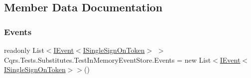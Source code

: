 \subsection{Member Data Documentation}
\mbox{\label{classCqrs_1_1Tests_1_1Substitutes_1_1TestInMemoryEventStore_add97988e933c2316c445bf4611c2d0ba}} 
\subsubsection{\texorpdfstring{Events}{Events}}
{\footnotesize\ttfamily readonly List$<$\hyperlink{interfaceCqrs_1_1Events_1_1IEvent}{I\+Event}$<$\hyperlink{interfaceCqrs_1_1Authentication_1_1ISingleSignOnToken}{I\+Single\+Sign\+On\+Token}$>$ $>$ Cqrs.\+Tests.\+Substitutes.\+Test\+In\+Memory\+Event\+Store.\+Events = new List$<$\hyperlink{interfaceCqrs_1_1Events_1_1IEvent}{I\+Event}$<$\hyperlink{interfaceCqrs_1_1Authentication_1_1ISingleSignOnToken}{I\+Single\+Sign\+On\+Token}$>$$>$()}

